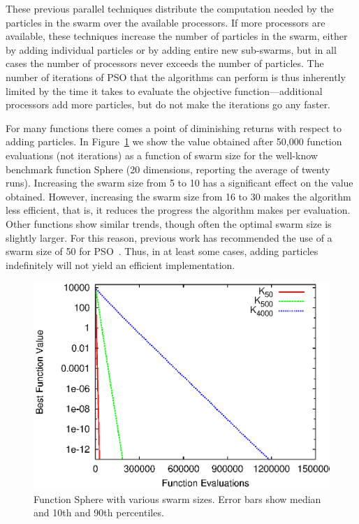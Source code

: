 \documentclass[journal,letterpaper]{IEEEtran}
\newcommand{\fig}[1]{Figure~\ref{fig:#1}}
\begin{document}
These previous parallel techniques distribute the computation needed by the
particles in the swarm over the available processors.  If more processors are
available, these techniques increase the number of particles in the swarm,
either by adding individual particles or by adding entire new sub-swarms, but
in all cases the number of processors never exceeds the number of particles.
The number of iterations of PSO that the algorithms can perform is thus
inherently limited by the time it takes to evaluate the objective
function---additional processors add more particles, but do not make the
iterations go any faster.

For many functions there comes a point of diminishing returns with respect to
adding particles.  In \fig{evals-sphere} we show the value obtained after
50,000 function evaluations (not iterations) as a function of swarm size for
the well-know benchmark function Sphere (20 dimensions, reporting the average
of twenty runs).  Increasing the swarm size from 5 to 10 has a significant
effect on the value obtained.  However, increasing the swarm size from 16 to 30
makes the algorithm less efficient, that is, it reduces the progress the
algorithm makes per evaluation.  Other functions show similar trends, though
often the optimal swarm size is slightly larger.  For this reason, previous
work has recommended the use of a swarm size of 50 for
PSO~\cite{bratton-2007-defining-a-standard-for-pso}.  Thus, in at least some
cases, adding particles indefinitely will not yield an efficient
implementation. 

\begin{figure}
  \centering
  \includegraphics[width=.8\columnwidth]{evals_sphere}
  \caption{Function Sphere with various swarm sizes. Error bars show median and
  10th and 90th percentiles.}
  \label{fig:evals-sphere}
\end{figure}
\end{document}

